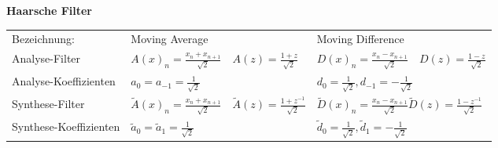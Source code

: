 \newpage
\textbf{Haarsche Filter }\\
  \begin{tabularx}{\textwidth}{l |l |X}
    Bezeichnung:
      & Moving Average
      & Moving Difference \\
    Analyse-Filter
      & $A(x)_n = \frac{x_n + x_{n+1}}{\sqrt{2}} \quad
         A(z) = \frac{1+z}{\sqrt{2}}$
      & $D(x)_n = \frac{x_n - x_{n+1}}{\sqrt{2}} \quad
         D(z) = \frac{1-z}{\sqrt{2}}$ \\
    Analyse-Koeffizienten
      & $a_0 = a_{-1} = \frac{1}{\sqrt{2}}$
      & $d_0 = \frac{1}{\sqrt{2}}, d_{-1} = -\frac{1}{\sqrt{2}}$ \\
    Synthese-Filter
      & $\tilde{A}(x)_n = \frac{x_n + x_{n+1}}{\sqrt{2}} \quad
         \tilde{A}(z) = \frac{1+z^{-1}}{\sqrt{2}}$
      & $\tilde{D}(x)_n = \frac{x_n - x_{n+1}}{\sqrt{2}}
         \tilde{D}(z) = \frac{1-z^{-1}}{\sqrt{2}}$ \\
    Synthese-Koeffizienten
      & $\tilde{a}_0 = \tilde{a}_{1} = \frac{1}{\sqrt{2}}$
      & $\tilde{d}_0 = \frac{1}{\sqrt{2}}, \tilde{d}_{1} = -\frac{1}{\sqrt{2}}$ \\
    
  \end{tabularx}